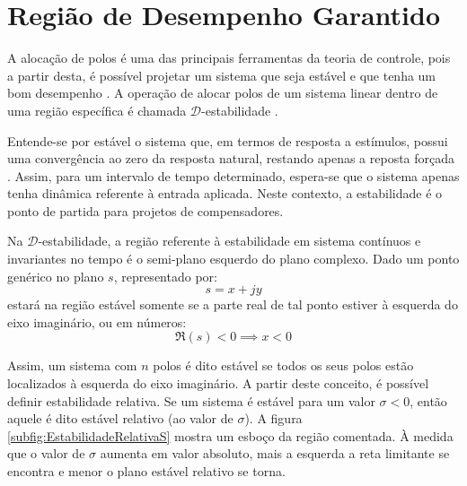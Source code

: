 \chapter{Região de Desempenho Garantido}

A alocação de polos é uma das principais ferramentas da teoria de controle, pois a partir desta, é possível projetar um sistema que seja estável e que tenha um bom desempenho \cite{ROSINOVA2014}. A operação de alocar polos de um sistema linear dentro de uma região específica é chamada $\mathscr{D}$-estabilidade \cite{WISNIEWSKI2017}.

Entende-se por estável o sistema que, em termos de resposta a estímulos, possui uma convergência ao zero da resposta natural, restando apenas a reposta forçada \cite{NISE2011}. Assim, para um intervalo de tempo determinado, espera-se que o sistema apenas tenha dinâmica referente à entrada aplicada. Neste contexto, a estabilidade é o ponto de partida para projetos de compensadores.

Na $\mathscr{D}$-estabilidade, a região referente à estabilidade em sistema contínuos e invariantes no tempo é o semi-plano esquerdo do plano complexo. Dado um ponto genérico no plano $s$, representado por:
\begin{equation}
  s = x + jy\label{eq:PontoGenericoPlanoS}
\end{equation}
estará na região estável somente se a parte real de tal ponto estiver à esquerda do eixo imaginário, ou em números:
\begin{equation}
  \Re{(s)} < 0 \implies x < 0
\end{equation}

Assim, um sistema com $n$ polos é dito estável se todos os seus polos estão localizados à esquerda do eixo imaginário. A partir deste conceito, é possível definir estabilidade relativa. Se um sistema é estável para um valor $\sigma < 0$, então aquele é dito estável relativo (ao valor de $\sigma$). A figura \ref{subfig:EstabilidadeRelativaS} mostra um esboço da região comentada. À medida que o valor de $\sigma$ aumenta em valor absoluto, mais a esquerda a reta limitante se encontra e menor o plano estável relativo se torna.


